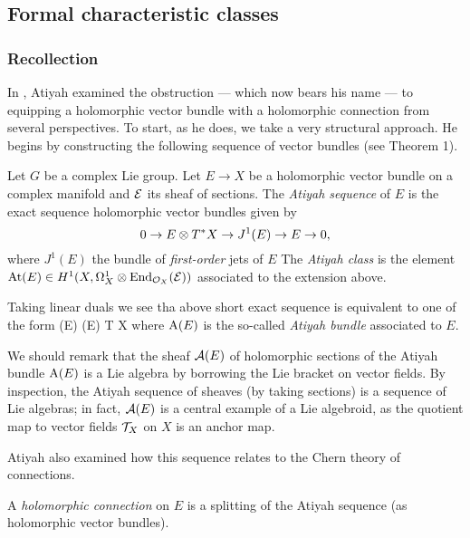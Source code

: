 \subsection{Formal characteristic classes}

\subsubsection{Recollection}

In \cite{atiyah}, Atiyah examined the obstruction --- which now bears his name --- to equipping a holomorphic vector bundle with a holomorphic connection from several perspectives. To start, as he does, we take a very structural approach. He begins by constructing the following sequence of vector bundles (see Theorem 1).

\begin{dfn}
Let $G$ be a complex Lie group. Let $E \to X$ be a holomorphic vector
bundle on a complex manifold and $\mathcal E$ its sheaf of sections. The {\em Atiyah sequence} of $E$ is the
exact sequence holomorphic vector bundles given by
\[
0 \to E \otimes T^* X \to J^1(E) \to E \to 0,
\]
where $J^1(E)$ the bundle of {\em first-order} jets of $E$
The {\em Atiyah class} is the element ${\rm At}(E) \in H^1(X, \Omega^1_X
\otimes {\rm End}_{\mathcal O_X} (\mathcal E))$ associated to the extension above. 
\end{dfn}

\begin{rmk}
Taking linear duals we see tha above short exact sequence is
equivalent to one of the form
 \to \End (E) (E) \to T X 
\een
where ${\rm A}(E)$ is the so-called {\em Atiyah bundle} associated to $E$. 

We should remark that the sheaf $\mathcal A(E)$ of holomorphic sections of the Atiyah bundle ${\rm A}(E)$ is a Lie algebra by borrowing the Lie bracket on vector fields.
By inspection, the Atiyah sequence of sheaves (by taking sections) is a sequence of Lie algebras; 
 in fact, $\mathcal A(E)$ is a central example of a Lie algebroid, as the quotient map to vector fields $\mathcal T_X$ on $X$ is an anchor map.
\end{rmk}

Atiyah also examined how this sequence relates to the Chern theory of connections.

\begin{prop} 
A {\em holomorphic connection} on $E$ is a splitting of the Atiyah sequence (as holomorphic vector bundles).
\end{prop}


